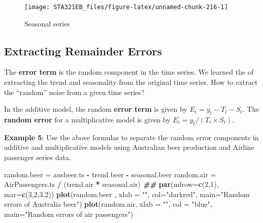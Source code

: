 \documentclass[
]{book}
\newenvironment{Shaded}{\begin{snugshade}}{\end{snugshade}}
\newcommand{\AttributeTok}[1]{\textcolor[rgb]{0.13,0.29,0.53}{#1}}
\newcommand{\DecValTok}[1]{\textcolor[rgb]{0.00,0.00,0.81}{#1}}
\newcommand{\DocumentationTok}[1]{\textcolor[rgb]{0.56,0.35,0.01}{\textbf{\textit{#1}}}}
\newcommand{\FunctionTok}[1]{\textcolor[rgb]{0.13,0.29,0.53}{\textbf{#1}}}
\newcommand{\NormalTok}[1]{#1}
\newcommand{\OtherTok}[1]{\textcolor[rgb]{0.56,0.35,0.01}{#1}}
\newcommand{\SpecialCharTok}[1]{\textcolor[rgb]{0.81,0.36,0.00}{\textbf{#1}}}
\newcommand{\StringTok}[1]{\textcolor[rgb]{0.31,0.60,0.02}{#1}}
\begin{document}
\begin{figure}

{\centering \texttt{[image: STA321EB\_files/figure-latex/unnamed-chunk-216-1]} 

}

\caption{Seasonal series}\label{fig:unnamed-chunk-216}
\end{figure}

\hypertarget{extracting-remainder-errors}{%
\subsection{Extracting Remainder Errors}\label{extracting-remainder-errors}}

The \textbf{error term} is the random component in the time series. We learned the of extracting the trend and seasonality from the original time series. How to extract the ``random'' noise from a given time series?

In the additive model, the random \textbf{error term} is given by \(E_t = y_t - T_t -S_t\). The \textbf{random error} for a multiplicative model is given by \(E_t = y_t/(T_t \times S_t)\).

\textbf{Example 5}: Use the above formulas to separate the random error components in additive and multiplicative models using Australian beer production and Airline passenger series data.

\begin{Shaded}
\begin{Highlighting}[]
\NormalTok{random.beer }\OtherTok{=}\NormalTok{ ausbeer.ts }\SpecialCharTok{{-}}\NormalTok{ trend.beer }\SpecialCharTok{{-}}\NormalTok{ seasonal.beer}
\NormalTok{random.air }\OtherTok{=}\NormalTok{ AirPassengers.ts }\SpecialCharTok{/}\NormalTok{ (trend.air }\SpecialCharTok{*}\NormalTok{ seasonal.air)}
\DocumentationTok{\#\#}
\FunctionTok{par}\NormalTok{(}\AttributeTok{mfrow=}\FunctionTok{c}\NormalTok{(}\DecValTok{2}\NormalTok{,}\DecValTok{1}\NormalTok{), }\AttributeTok{mar=}\FunctionTok{c}\NormalTok{(}\DecValTok{3}\NormalTok{,}\DecValTok{2}\NormalTok{,}\DecValTok{3}\NormalTok{,}\DecValTok{2}\NormalTok{))}
\FunctionTok{plot}\NormalTok{(random.beer , }\AttributeTok{xlab =} \StringTok{""}\NormalTok{, }\AttributeTok{col=}\StringTok{"darkred"}\NormalTok{, }\AttributeTok{main=}\StringTok{"Random errors of Australia beer"}\NormalTok{)}
\FunctionTok{plot}\NormalTok{(random.air, }\AttributeTok{xlab =} \StringTok{""}\NormalTok{, }\AttributeTok{col =} \StringTok{"blue"}\NormalTok{, }\AttributeTok{main=}\StringTok{"Random errors of air passengers"}\NormalTok{)}
\end{Highlighting}
\end{Shaded}
\end{document}
